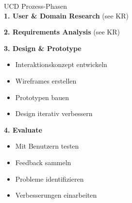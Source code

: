 \begin{theorem}{UCD Prozess-Phasen}\\
\textbf{1. User \& Domain Research} (see KR)

\textbf{2. Requirements Analysis} (see KR)

\begin{minipage}[t]{0.5\linewidth}
\textbf{3. Design \& Prototype}
\begin{itemize}
    \item Interaktionskonzept entwickeln
    \item Wireframes erstellen
    \item Prototypen bauen
    \item Design iterativ verbessern
\end{itemize}
\end{minipage}
\begin{minipage}[t]{0.5\linewidth}
\textbf{4. Evaluate}
\begin{itemize}
    \item Mit Benutzern testen
    \item Feedback sammeln
    \item Probleme identifizieren
    \item Verbesserungen einarbeiten
\end{itemize}
\end{minipage}
\end{theorem}

